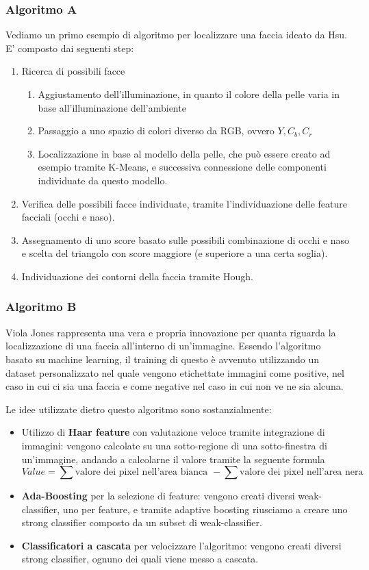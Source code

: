 \documentclass{article}
\begin{document}
\subsubsection{Algoritmo A}
Vediamo un primo esempio di algoritmo per localizzare una faccia ideato da Hsu.
E' composto dai seguenti step:
\begin{enumerate}
    \item Ricerca di possibili facce
    \begin{enumerate}
        \item Aggiustamento dell'illuminazione, in quanto il colore della pelle varia in base all'illuminazione dell'ambiente
        \item Passaggio a uno spazio di colori diverso da RGB, ovvero $Y, C_b, C_r$
        \item Localizzazione in base al modello della pelle, che può essere creato ad esempio tramite K-Means, e successiva connessione delle componenti individuate da questo modello.
    \end{enumerate}
    \item Verifica delle possibili facce individuate, tramite l'individuazione delle feature facciali (occhi e naso).
    \item Assegnamento di uno score basato sulle possibili combinazione di occhi e naso e scelta del triangolo con score maggiore (e superiore a una certa soglia).
    \item Individuazione dei contorni della faccia tramite Hough.
\end{enumerate}

\subsubsection{Algoritmo B}
Viola Jones rappresenta una vera e propria innovazione per quanta riguarda la localizzazione
di una faccia all'interno di un'immagine. Essendo l'algoritmo basato su machine learning, il training di questo è avvenuto utilizzando un dataset personalizzato nel quale vengono etichettate immagini come positive, nel caso in cui ci sia una faccia e come negative nel caso in cui non ve ne sia alcuna.

\bigskip
Le idee utilizzate dietro questo algoritmo sono sostanzialmente:
\begin{itemize}
    \item Utilizzo di \textbf{Haar feature} con valutazione veloce tramite integrazione di immagini: vengono calcolate su una sotto-regione di una sotto-finestra di un'immagine, andando a calcolarne il valore tramite la seguente formula
    $$Value = \sum \text{valore dei pixel nell'area bianca } - \sum \text{valore dei pixel nell'area nera}$$
    \item \textbf{Ada-Boosting} per la selezione di feature: vengono creati diversi weak-classifier, uno per feature, e tramite adaptive boosting riusciamo a creare uno strong classifier composto da un subset di weak-classifier.
    \item \textbf{Classificatori a cascata} per velocizzare l'algoritmo: vengono creati diversi strong classifier, ognuno dei quali viene messo a cascata.
\end{itemize}
\end{document}
